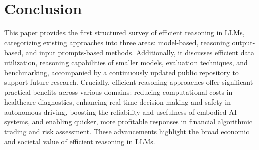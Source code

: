\section{Conclusion}

This paper provides the first structured survey of efficient reasoning in LLMs, categorizing existing approaches into three areas: model-based, reasoning output-based, and input prompts-based methods. Additionally, it discusses efficient data utilization, reasoning capabilities of smaller models, evaluation techniques, and benchmarking, accompanied by a continuously updated public repository to support future research. Crucially, efficient reasoning approaches offer significant practical benefits across various domains: reducing computational costs in healthcare diagnostics, enhancing real-time decision-making and safety in autonomous driving, boosting the reliability and usefulness of embodied AI systems, and enabling quicker, more profitable responses in financial algorithmic trading and risk assessment. These advancements highlight the broad economic and societal value of efficient reasoning in LLMs.